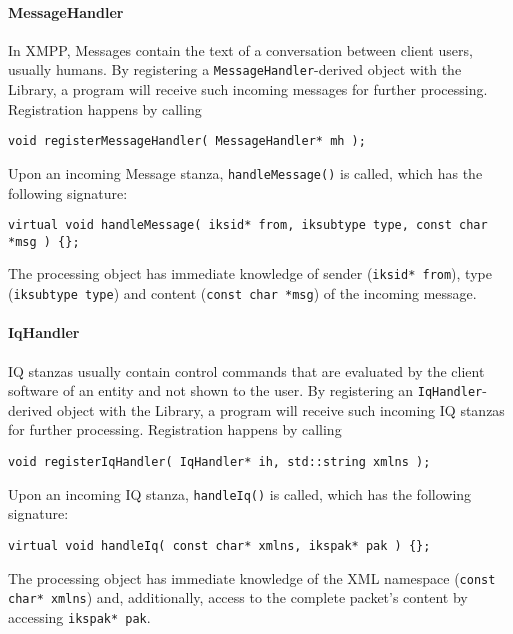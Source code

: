 \paragraph{MessageHandler}
In XMPP, Messages contain the text of a conversation between client users, usually humans. By registering a \texttt{MessageHandler}-derived object with the Library, a program will receive such incoming messages for further processing. Registration happens by calling
\begin{flushleft}
\texttt{void registerMessageHandler( MessageHandler* mh );}
\end{flushleft}
Upon an incoming Message stanza, \texttt{handleMessage()} is called, which has the following signature:
\begin{flushleft}
\texttt{virtual void handleMessage( iksid* from, iksubtype type, const char *msg ) \{\};}
\end{flushleft}
The processing object has immediate knowledge of sender (\texttt{iksid* from}), type (\texttt{iksubtype type}) and content (\texttt{const char *msg}) of the incoming message.

\paragraph{IqHandler}
IQ stanzas usually contain control commands that are evaluated by the client software of an entity and not shown to the user. By registering an \texttt{IqHandler}-derived object with the Library, a program will receive such incoming IQ stanzas for further processing. Registration happens by calling
\begin{flushleft}
\texttt{void registerIqHandler( IqHandler* ih, std::string xmlns );}
\end{flushleft}
Upon an incoming IQ stanza, \texttt{handleIq()} is called, which has the following signature:
\begin{flushleft}
\texttt{virtual void handleIq( const char* xmlns, ikspak* pak ) \{\};}
\end{flushleft}
The processing object has immediate knowledge of the XML namespace (\texttt{const char* xmlns}) and, additionally, access to the complete packet's content by accessing \texttt{ikspak* pak}.

